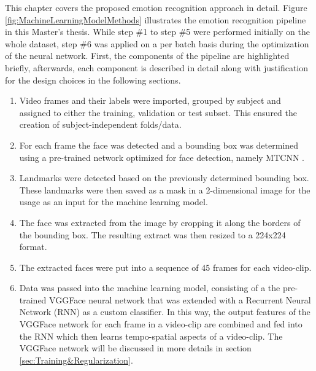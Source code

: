 \noindent This chapter covers the proposed emotion recognition approach in detail. Figure \ref{fig:MachineLearningModelMethods} illustrates the emotion recognition pipeline in this Master's thesis. While step \#1 to step \#5 were performed initially on the whole dataset, step \#6 was applied on a per batch basis during the optimization of the neural network. First, the components of the pipeline are highlighted briefly, afterwards, each component is described in detail along with justification for the design choices in the following sections. 

\begin{enumerate}
    \item Video frames and their labels were imported, grouped by subject and assigned to either the training, validation or test subset. This ensured the creation of subject-independent folds/data.
    \item For each frame the face was detected and a bounding box was determined using a pre-trained network optimized for face detection, namely MTCNN \citep{Zhang:2016:MTCCN}.
    \item Landmarks were detected based on the previously determined bounding box. These landmarks were then saved as a mask in a 2-dimensional image for the usage as an input for the machine learning model.
    \item The face was extracted from the image by cropping it along the borders of the bounding box. The resulting extract was then resized to a 224x224 format.
    \item The extracted faces were put into a sequence of 45 frames for each video-clip.
    \item Data was passed into the machine learning model, consisting of a the pre-trained VGGFace \citep{Cao:2018:VGGFace2} neural network that was extended with a Recurrent Neural Network (RNN) as a custom classifier. In this way, the output features of the VGGFace network for each frame in a video-clip are combined and fed into the RNN which then learns  tempo-spatial aspects of a video-clip. The VGGFace network will be discussed in more details in section \ref{sec:Training&Regularization}.
\end{enumerate}


